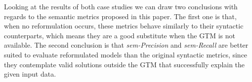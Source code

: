 Looking at the results of both case studies we can draw two conclusions with regards to the semantic metrics proposed in this paper. The first one is that, when no reformulation occurs, these metrics behave similarly to their syntactic counterparts, which means they are a good substitute when the GTM is not available. The second conclusion is that {\em sem-Precision} and {\em sem-Recall} are better suited to evaluate reformulated models than the original syntactic metrics, since they contemplate valid solutions outside the GTM that successfully explain the given input data.







